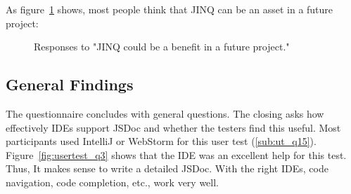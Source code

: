 As figure~\ref{fig:usertest_q2} shows, most people think that JINQ can be an
asset in a future project:
\begin{figure}[H]
\centering
{}
\caption{Responses to "JINQ could be a benefit in a future project."}
\label{fig:usertest_q2}
\end{figure}

\subsection{General Findings} %
\label{sub:General Findings}
The questionnaire concludes with general questions. The closing asks how
effectively IDEs support JSDoc and whether the testers find this useful. Most
participants used IntelliJ or WebStorm for this user test (\ref{sub:ut_q15}).
Figure~\ref{fig:usertest_q3} shows that the IDE was an excellent help for this
test. Thus, It makes sense to write a detailed JSDoc. With the right IDEs, code
navigation, code completion, etc., work very well.

